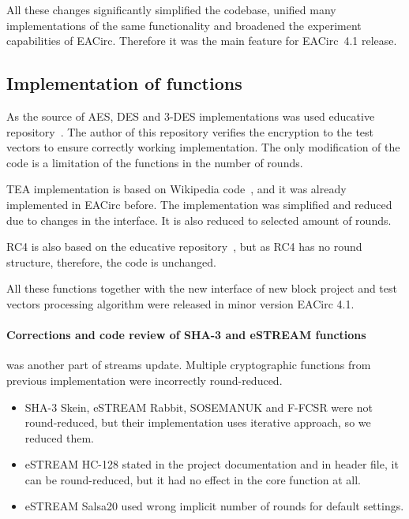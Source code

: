 \documentclass[
  print, %
  Table,   %
  nolof,     %
  nolot,     %
  11pt, %
  oneside  %
]{fithesis3}
\begin{document}
All these changes significantly simplified the codebase, unified many implementations of the same functionality and broadened the experiment capabilities of EACirc. Therefore it was the main feature for EACirc~4.1 release.

\subsection{Implementation of functions}
\label{subsec:method-data-funcs}

As the source of AES, DES and 3-DES implementations was used educative repository~\cite{cryptoFunc}. The author of this repository verifies the encryption to the test vectors to ensure correctly working implementation. The only modification of the code is a limitation of the functions in the number of rounds.

TEA implementation is based on Wikipedia code~\cite{teaWiki}, and it was already implemented in EACirc before. The implementation was simplified and reduced due to changes in the interface. It is also reduced to selected amount of rounds.

RC4 is also based on the educative repository~\cite{cryptoFunc}, but as RC4 has no round structure, therefore, the code is unchanged.

All these functions together with the new interface of new block project and test vectors processing algorithm were released in minor version EACirc 4.1.

\paragraph{Corrections and code review of SHA-3 and eSTREAM functions} was another part of streams update. Multiple cryptographic functions from previous implementation were incorrectly round-reduced.
\label{par:method-data-funcs-bugs}

\begin{itemize}
    \item SHA-3 Skein, eSTREAM Rabbit, SOSEMANUK and F-FCSR were not round-reduced, but their implementation uses iterative approach, so we reduced them.
    \item eSTREAM HC-128 stated in the project documentation and in header file, it can be round-reduced, but it had no effect in the core function at all.
    \item eSTREAM Salsa20 used wrong implicit number of rounds for default settings.
\end{itemize}
\end{document}
